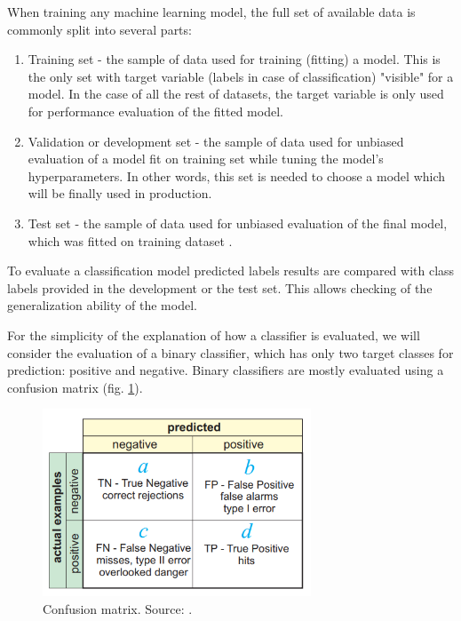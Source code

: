 When training any machine learning model, the full set of available data is commonly split into several parts:
\begin{enumerate}
    \item Training set - the sample of data used for training (fitting) a model. This is the only set with target variable (labels in case of classification) "visible" for a model. In the case of all the rest of datasets, the target variable is only used for performance evaluation of the fitted model. 
    \item Validation or development set - the sample of data used for unbiased evaluation of a model fit on training set while tuning the model's hyperparameters. In other words, this set is needed to choose a model which will be finally used in production.
    \item Test set - the sample of data used for unbiased evaluation of the final model, which was fitted on training dataset \citep{Kuhn-2013}.
\end{enumerate}

To evaluate a classification model predicted labels results are compared with class labels provided in the development or the test set. This allows checking of the generalization ability of the model.

For the simplicity of the explanation of how a classifier is evaluated, we will consider the evaluation of a binary classifier, which has only two target classes for prediction: positive and negative. 
Binary classifiers are mostly evaluated using a confusion matrix (fig. \ref{fig:confusion-matrix}).

\begin{figure}[h]
    \centering
    \includegraphics[width=8cm]{Images/Confusion-matrix.png}
    \caption{Confusion matrix. Source: \citep{kohavi:glossary}.}
    \label{fig:confusion-matrix}
\end{figure}

